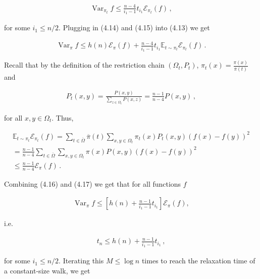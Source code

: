 \documentclass[10pt,a4paper]{article}
\begin{document}
\[\begin{gathered}
\operatorname{Var}_{\pi_{t}}f\leq\frac{n-4}{i_{1}-1}t_{i_{1}}\mathcal{E}_{\pi_{t}}(f)\,,
\end{gathered}\]


for some $i_{1}\leq n/2$.
Plugging in (4.14) and (4.15) into (4.13) we get\par


\[\begin{gathered}
\operatorname{Var}_{\pi}f\leq h(n)\mathcal{E}_{\pi}(f)+\frac{n-4}{i_{1}-1}t_{i_{1}}\mathbb{E}_{t\sim\pi_{t}}\mathcal{E}_{\pi_{t}}(f)\,.
\end{gathered}\]


Recall that by the definition of the restriction chain $(\Omega_{t},P_{t})$, $\pi_{t}(x)=\frac{\pi(x)}{\overline{\pi}(t)}$ and\par


\[\begin{gathered}
P_{t}(x,y)=\frac{P(x,y)}{\sum_{z\in\Omega_{t}}P(x,z)}=\frac{n-1}{n-4}P(x,y)\,,
\end{gathered}\]


for all $x,y\in\Omega_{t}$. Thus,\par


\[\begin{gathered}
\displaystyle\mathbb{E}_{t\sim\pi_{t}}\mathcal{E}_{\pi_{t}}(f) \displaystyle=\sum_{t\in\overline{\Omega}}\overline{\pi}(t)\sum_{x,y\in\Omega_{t}}\pi_{t}(x)P_{t}(x,y)(f(x)-f(y))^{2} \\
\displaystyle=\frac{n-1}{n-4}\sum_{t\in\overline{\Omega}}\sum_{x,y\in\Omega_{t}}\pi(x)P(x,y)(f(x)-f(y))^{2} \\
\displaystyle\leq\frac{n-1}{n-4}\mathcal{E}_{\pi}(f)\,.
\end{gathered}\]


Combining (4.16) and (4.17) we get that for all functions $f$\par


\[\begin{gathered}
\operatorname{Var}_{\pi}f\leq\left[h(n)+\frac{n-1}{i_{1}-1}t_{i_{1}}\right]\mathcal{E}_{\pi}(f),
\end{gathered}\]


i.e.\par


\[\begin{gathered}
t_{n}\leq h(n)+\frac{n-1}{i_{1}-1}t_{i_{1}}\,,
\end{gathered}\]


for some $i_{1}\leq n/2$. Iterating this $M\leq\log n$ times to reach the relaxation time of a constant-size walk, we get\par
\end{document}
